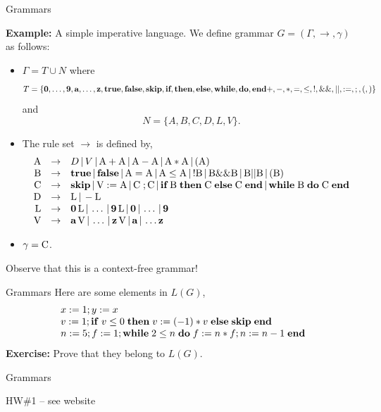 \documentclass{beamer}
\begin{document}
\begin{frame}[fragile]{Grammars}

\scriptsize
{\bf Example:} A simple imperative language.  We define grammar $G=(\Gamma,\rightarrow,\gamma)$ as follows:
\begin{itemize}
\item $\Gamma = T \cup N$ where
{\tiny
\[
T =\{\mbox{\bf 0},\ldots,\mbox{\bf 9},\mbox{\bf a},\ldots,\mbox{\bf z},\mbox{\bf true},\mbox{\bf false},\mbox{\bf skip},
\mbox{\bf if},\mbox{\bf then},\mbox{\bf else},\mbox{\bf while},\mbox{\bf do},\mbox{\bf end}+,-,*,=,\le,!,\&\&,||,:=,;,(,)\}
\]
}
and
{\tiny
\[
N = \{A,B,C,D,L,V\}.
\]
}
\item The rule set $\rightarrow$ is defined by,
{\tiny
\[
\begin{array}{rcl}
\mbox{A} &\rightarrow& D \,|\, V \,|\, \mbox{A} +\mbox{A} \,|\, \mbox{A} - \mbox{A} \,|\,
	\mbox{A} * \mbox{A}\,|\, ( \mbox{A} )\\

\mbox{B} &\rightarrow& \mbox{\bf true} \,|\, \mbox{\bf false} \,|\, \mbox{A} = \mbox{A} \,|\,
	\mbox{A} \le \mbox{A} \,|\, ! \mbox{B} \,|\, \mbox{B} \&\& \mbox{B} \,|\,
	\mbox{B} || \mbox{B} \,|\, (\mbox{B})\\

\mbox{C} &\rightarrow& \mbox{\bf skip} \,|\, \mbox{V} := \mbox{A} \,|\,\mbox{C}\; ; \mbox{C} \,|\,
	\mbox{\bf if} \; \mbox{B}\; \mbox{\bf then}\;\mbox{C}\; \mbox{\bf else}\; \mbox{C} \; \mbox{\bf end}\,|\,
	\mbox{\bf while}\; \mbox{B}\; \mbox{\bf  do}\; \mbox{C}\; \mbox{\bf end}\\

\mbox{D} &\rightarrow& \mbox{L} \,|\, - \mbox{L}\\

\mbox{L} &\rightarrow& \mbox{\bf 0}\, \mbox{L} \,|\, \ldots \,|\,  \mbox{\bf 9} \,\mbox{L} \,|\, \mbox{\bf 0} \,|\, \ldots\,|\,\mbox{\bf 9}\\

\mbox{V} &\rightarrow& \mbox{\bf a}\,\mbox{V} \,|\, \ldots\,|\, \mbox{\bf z}\,\mbox{V} \,|\, \mbox{\bf a} \,|\, \ldots \mbox{\bf z}
\end{array}
\]
}
\item $\gamma =\mbox{C}$.
\end{itemize}

Observe that this is a context-free grammar!
\end{frame}

\begin{frame}{Grammars}
Here are some elements in $L(G)$,
\[
\begin{array}{l}
x := 1 ; y := x\\
v := 1; {\bf if}\; {v \le 0}\;{\bf then}\;{v := (-1)*v}\;{\bf else}\;{\mbox{\bf skip}}\;\mbox{\bf end}\\
n := 5 ; f := 1 ; {\bf while}\; {2 \le n}\;{\bf do}\;{f := n*f ; n := n - 1}\; \mbox{\bf end}
\end{array}
\]
{\bf Exercise:} Prove that they belong to $L(G)$.

\end{frame}

\begin{frame}{Grammars}

HW\#1 -- see website

\end{frame}
\end{document}
